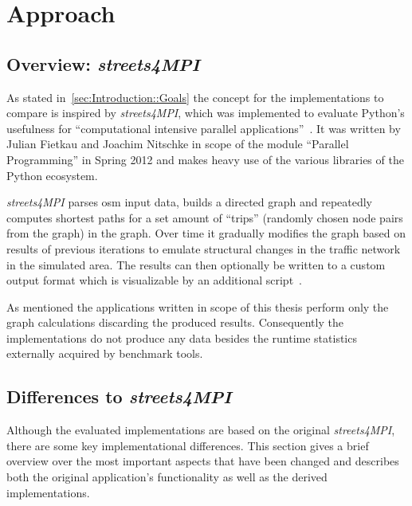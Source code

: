 \chapter{Approach}
\label{ch:Approach}


\section{Overview: \textit{streets4MPI}}
\label{sec:Approach::Overview}

As stated in~\autoref{sec:Introduction::Goals} the concept for the implementations to compare is inspired by \textit{streets4MPI}, which was implemented to evaluate Python's usefulness for ``computational intensive parallel applications''~\cite[p.3]{streets_report}. It was written by Julian Fietkau and Joachim Nitschke in scope of the module ``Parallel Programming'' in Spring 2012 and makes heavy use of the various libraries of the Python ecosystem.

\textit{streets4MPI} parses \gls{osm} input data, builds a directed graph and repeatedly computes shortest paths for a set amount of ``trips'' (randomly chosen node pairs from the graph) in the graph. Over time it gradually modifies the graph based on results of previous iterations to emulate structural changes in the traffic network in the simulated area. The results can then optionally be written to a custom output format which is visualizable by an additional script~\cite{streets_report}.

As mentioned the applications written in scope of this thesis perform only the graph calculations discarding the produced results. Consequently the implementations do not produce any data besides the runtime statistics externally acquired by benchmark tools.

\section{Differences to \textit{streets4MPI}}
\label{sec:Approach::Differences}

Although the evaluated implementations are based on the original \textit{streets4MPI}, there are some key implementational differences. This section gives a brief overview over the most important aspects that have been changed and describes both the original application's functionality as well as the derived implementations.

